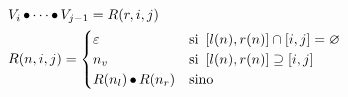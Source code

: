 \[
\begin{split}
	& V_i \operatorname{\bullet} \cdots \operatorname{\bullet} V_{j - 1} = R(r, i, j) \\
	& R(n, i, j) =
	\begin{cases}
		\mathbf{\varepsilon} &\text{si } \left[l(n), r(n)\right] \cap \left[i, j\right] = \varnothing \\
		n_v &\text{si } \left[l(n), r(n)\right] \supseteq \left[i, j\right] \\
		R(n_l) \operatorname{\bullet} R(n_r) &\text{sino}
	\end{cases}
\end{split}
\]

% 
% 
